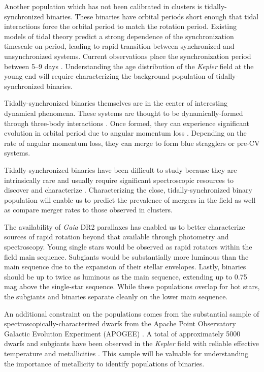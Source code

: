 \documentclass[manuscript]{aastex6}
\newcommand{\Kepler}{\mbox{\textit{Kepler}}}
\newcommand{\Gaia}{\mbox{\textit{Gaia}}}
\newcommand{\gvs}{\authorcomment1}
\begin{document}
Another population which has not been calibrated in clusters is
tidally-synchronized binaries. These binaries have orbital periods short enough
that tidal interactions force the orbital period to match the rotation period.
Existing models of tidal theory \citep{Zahn77} predict a strong dependence of 
the synchronization timescale on period, leading to rapid transition between
synchronized and unsynchronized systems. Current observations place the
synchronization period between 5--9 days \citep{Raghavan10}. Understanding the 
age distribution of the \Kepler{} field at the young end will require 
characterizing the background population of tidally-synchronized binaries.

Tidally-synchronized binaries themselves are in the center of interesting
dynamical phenomena. These systems are thought to be dynamically-formed 
through three-body interactions \citep{Tokovinin06, Fabrycky07}. Once formed, they can experience significant
evolution in orbital period due to angular momentum loss \citep{Andronov06}.
Depending on the rate of angular momentum loss, they can merge to form blue 
stragglers or pre-CV systems.

Tidally-synchronized binaries have been difficult to study because they are 
intrinsically rare and usually require significant spectroscopic resources 
to discover and characterize \citep{Mathieu90, Raghavan10, Geller15}. 
Characterizing the close, tidally-synchronized binary population will enable 
us to predict the prevalence of mergers in the field as well as compare merger
rates to those observed in clusters.

The availability of \Gaia{} DR2 parallaxes \citep{Gaia18,Lindegren18} has
enabled us to better characterize sources of rapid rotation beyond that
available through photometry and spectroscopy. Young single stars would be
observed as rapid rotators within the field main sequence. Subgiants would be
substantially more luminous than the main sequence due to the expansion of
their stellar envelopes. Lastly, binaries should be up to twice as luminous as
the main sequence, extending up to 0.75 mag above the single-star sequence.
While these populations overlap for hot stars, the subgiants and binaries
separate cleanly on the lower main sequence.

An additional constraint on the populations comes from the substantial sample
of spectroscopically-characterized dwarfs from the Apache Point Observatory
Galactic Evolution Experiment (APOGEE) \citep{Majewski17}. A total of 
approximately 5000 \gvs{Exact number} dwarfs and subgiants
have been observed in the \Kepler{} field with reliable effective temperature
and metallicities \citep{Holtzmann18}. This sample will be valuable for
understanding the importance of metallicity to identify populations of
binaries.
\end{document}

